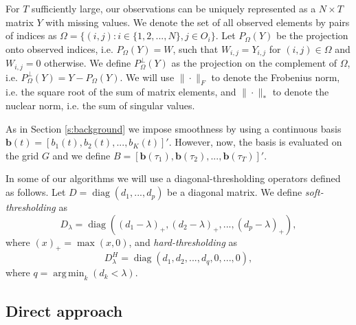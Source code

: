 \documentclass[preprint]{imsart}
\numberwithin{equation}{section}
\theoremstyle{plain}
\newcommand{\bb}{\mathbf{b}}
\DeclareMathOperator*{\argmin}{arg\,min}
\DeclareMathOperator*{\diag}{diag}
\begin{document}

For $T$ sufficiently large, our observations can be uniquely represented as a $N \times T$ matrix $Y$ with missing values. We denote the set of all observed elements by pairs of indices as $\Omega = \{ (i,j) : i\in \{1,2,...,N\}, j \in O_i \}$. Let $P_\Omega(Y)$ be the projection onto observed indices, i.e. $P_\Omega(Y) = W$, such that $W_{i,j} = Y_{i,j}$ for $(i,j) \in \Omega$ and $W_{i,j} = 0$ otherwise. We define $P^\perp_\Omega(Y)$ as the projection on the complement of $\Omega$, i.e. $P^\perp_\Omega(Y) = Y - P_\Omega(Y)$. We will use $\|\cdot\|_F$ to denote the Frobenius norm, i.e. the square root of the sum of matrix elements, and $\|\cdot\|_*$ to denote the nuclear norm, i.e. the sum of singular values.

As in Section \ref{s:background} we impose smoothness by using a continuous basis $\bb(t) = [b_1(t),b_2(t),...,b_K(t)]'$. However, now, the basis is evaluated on the grid $G$ and we define $B = [\bb(\tau_1),\bb(\tau_2),...,\bb(\tau_T)]'$. %

In some of our algorithms we will use a diagonal-thresholding operators defined as follows. Let $D = \diag(d_1,...,d_p)$ be a diagonal matrix. We define {\em soft-thresholding} as
\begin{equation*}
D_\lambda = \diag((d_1 - \lambda)_+,(d_2 - \lambda)_+,...,(d_p - \lambda)_+),\label{eq:thresholding}
\end{equation*}
where $(x)_+ = \max(x, 0)$, and {\em hard-thresholding} as
\begin{equation*}
D_\lambda^H = \diag(d_1,d_2,...,d_q,0,...,0),\label{eq:thresholding}
\end{equation*}
where $q = \argmin_k(d_k < \lambda)$.

\subsection{Direct approach}\label{ss:direct-matrix}
\end{document}
